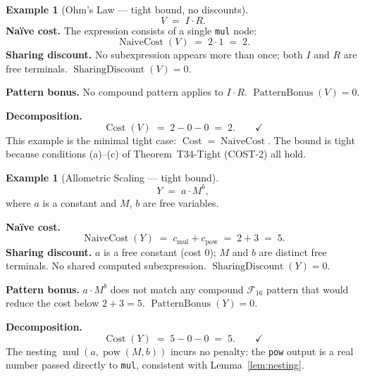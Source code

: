 \documentclass[12pt,a4paper]{article}
\theoremstyle{definition}
\newtheorem{example}[theorem]{Example}
\newcommand{\Cost}{\operatorname{Cost}}
\newcommand{\NC}{\operatorname{NaiveCost}}
\newcommand{\SD}{\operatorname{SharingDiscount}}
\newcommand{\PB}{\operatorname{PatternBonus}}
\begin{document}
\begin{example}[Ohm's Law --- tight bound, no discounts]
\label{ex:ohm}
\[
  V \;=\; I \cdot R.
\]
\textbf{Na\"{i}ve cost.}
The expression consists of a single \texttt{mul} node:
\[
  \NC(V) \;=\; 2 \cdot 1 \;=\; 2.
\]
\textbf{Sharing discount.}
No subexpression appears more than once; both $I$ and $R$ are free
terminals.  $\SD(V) = 0$.

\textbf{Pattern bonus.}
No compound pattern applies to $I \cdot R$.  $\PB(V) = 0$.

\textbf{Decomposition.}
\[
  \Cost(V) \;=\; 2 - 0 - 0 \;=\; 2. \qquad \checkmark
\]
This example is the minimal tight case: $\Cost = \NC$.  The bound is
tight because conditions (a)--(c) of Theorem~T34-Tight (COST-2) all hold.
\end{example}

\begin{example}[Allometric Scaling --- tight bound]
\label{ex:allometric}
\[
  Y \;=\; a \cdot M^b,
\]
where $a$ is a constant and $M$, $b$ are free variables.

\textbf{Na\"{i}ve cost.}
\[
  \NC(Y) \;=\; c_{\mathrm{mul}} + c_{\mathrm{pow}}
            \;=\; 2 + 3 \;=\; 5.
\]
\textbf{Sharing discount.}
$a$ is a free constant (cost 0); $M$ and $b$ are distinct free terminals.
No shared computed subexpression.  $\SD(Y) = 0$.

\textbf{Pattern bonus.}
$a \cdot M^b$ does not match any compound $\mathcal{F}_{16}$ pattern
that would reduce the cost below $2+3=5$.  $\PB(Y) = 0$.

\textbf{Decomposition.}
\[
  \Cost(Y) \;=\; 5 - 0 - 0 \;=\; 5. \qquad \checkmark
\]
The nesting $\operatorname{mul}(a, \operatorname{pow}(M,b))$ incurs no
penalty: the \texttt{pow} output is a real number passed directly to
\texttt{mul}, consistent with Lemma~\ref{lem:nesting}.
\end{example}
\end{document}
